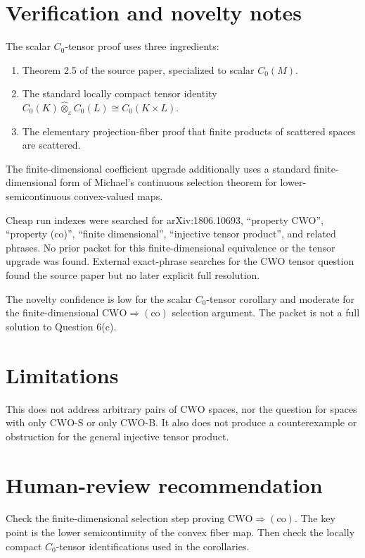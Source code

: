 \documentclass[11pt]{article}
\newcommand{\CWO}{\mathrm{CWO}}
\newcommand{\CWOS}{\mathrm{CWO}\text{-}\mathrm{S}}
\newcommand{\CWOB}{\mathrm{CWO}\text{-}\mathrm{B}}
\newcommand{\co}{\mathrm{(co)}}
\newcommand{\eps}{\varepsilon}
\begin{document}
\section*{Verification and novelty notes}

The scalar \(C_0\)-tensor proof uses three ingredients:
\begin{enumerate}
\item Theorem 2.5 of the source paper, specialized to scalar \(C_0(M)\).
\item The standard locally compact tensor identity
  \(C_0(K)\widehat{\otimes}_{\eps}C_0(L)\cong C_0(K\times L)\).
\item The elementary projection-fiber proof that finite products of scattered
  spaces are scattered.
\end{enumerate}

The finite-dimensional coefficient upgrade additionally uses a standard
finite-dimensional form of Michael's continuous selection theorem for
lower-semicontinuous convex-valued maps.

Cheap run indexes were searched for arXiv:1806.10693, ``property CWO'',
``property (co)'', ``finite dimensional'', ``injective tensor product'', and
related phrases. No prior packet for this finite-dimensional equivalence or
the tensor upgrade was found. External exact-phrase searches for the CWO
tensor question found the source paper but no later explicit full resolution.

The novelty confidence is low for the scalar \(C_0\)-tensor corollary and
moderate for the finite-dimensional \(\CWO\Rightarrow\co\) selection
argument. The packet is not a full solution to Question 6(c).

\section*{Limitations}

This does not address arbitrary pairs of \(\CWO\) spaces, nor the question
for spaces with only \(\CWOS\) or only \(\CWOB\). It also does not produce a
counterexample or obstruction for the general injective tensor product.

\section*{Human-review recommendation}

Check the finite-dimensional selection step proving \(\CWO\Rightarrow\co\).
The key point is the lower semicontinuity of the convex fiber map. Then check
the locally compact \(C_0\)-tensor identifications used in the corollaries.
\end{document}
